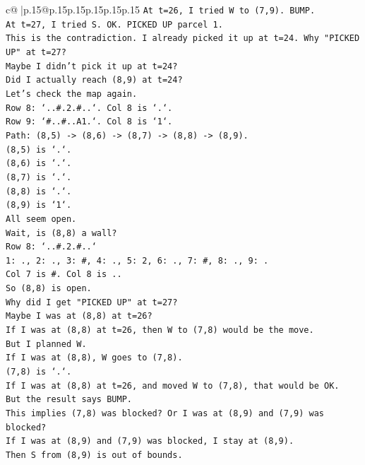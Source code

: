 \documentclass{article}
\begin{document}
{\begin{supertabular}{c@{$\;$}|p{.15\linewidth}@{}p{.15\linewidth}p{.15\linewidth}p{.15\linewidth}p{.15\linewidth}p{.15\linewidth}}
{{{\texttt{At t=26, I tried W to (7,9). BUMP.} \\
\texttt{At t=27, I tried S. OK. PICKED UP parcel 1.} \\
\texttt{This is the contradiction. I already picked it up at t=24. Why "PICKED UP" at t=27?} \\
\texttt{Maybe I didn't pick it up at t=24?} \\
\texttt{Did I actually reach (8,9) at t=24?} \\
\texttt{Let's check the map again.} \\
\texttt{Row 8: `..\#.2.\#..`. Col 8 is `.`.} \\
\texttt{Row 9: `\#..\#..A1.`. Col 8 is `1`.} \\
\texttt{Path: (8,5) {-}> (8,6) {-}> (8,7) {-}> (8,8) {-}> (8,9).} \\
\texttt{(8,5) is `.`.} \\
\texttt{(8,6) is `.`.} \\
\texttt{(8,7) is `.`.} \\
\texttt{(8,8) is `.`.} \\
\texttt{(8,9) is `1`.} \\
\texttt{All seem open.} \\
\texttt{Wait, is (8,8) a wall?} \\
\texttt{Row 8: `..\#.2.\#..`} \\
\texttt{1: ., 2: ., 3: \#, 4: ., 5: 2, 6: ., 7: \#, 8: ., 9: .} \\
\texttt{Col 7 is \#. Col 8 is ..} \\
\texttt{So (8,8) is open.} \\
\texttt{Why did I get "PICKED UP" at t=27?} \\
\texttt{Maybe I was at (8,8) at t=26?} \\
\texttt{If I was at (8,8) at t=26, then W to (7,8) would be the move.} \\
\texttt{But I planned W.} \\
\texttt{If I was at (8,8), W goes to (7,8).} \\
\texttt{(7,8) is `.`.} \\
\texttt{If I was at (8,8) at t=26, and moved W to (7,8), that would be OK.} \\
\texttt{But the result says BUMP.} \\
\texttt{This implies (7,8) was blocked? Or I was at (8,9) and (7,9) was blocked?} \\
\texttt{If I was at (8,9) and (7,9) was blocked, I stay at (8,9).} \\
\texttt{Then S from (8,9) is out of bounds.} \\
}}}
\end{supertabular}}
\end{document}
